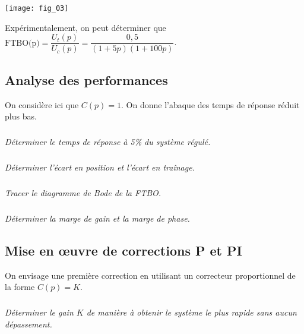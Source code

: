 \begin{multicols}{2}
\begin{center}
\texttt{[image: fig\_03]}
\end{center}
%
%
%
%
%

Expérimentalement, on peut déterminer que $\text{FTBO(p)}=\dfrac{U_t(p)}{U_c(p)}=\dfrac{0,5}{\left(1+5 p \right)\left(1+100 p \right)}$.

\subsection*{Analyse des performances}
On considère ici que $C(p)=1$. On donne l'abaque des temps de réponse réduit plus bas.

\subparagraph{}\textit{Déterminer le temps de réponse à 5\% du système régulé.}
\subparagraph{}\textit{Déterminer l'écart en position et l'écart en traînage.}

\subparagraph{}\textit{Tracer le diagramme de Bode de la FTBO.}

\subparagraph{}\textit{Déterminer la marge de gain et la marge de phase.}

\subsection*{Mise en \oe{}uvre de corrections P et PI}

On envisage une première correction en utilisant un correcteur proportionnel de la forme $C(p)=K$.


\subparagraph{}\textit{Déterminer le gain $K$ de manière à obtenir le système le plus rapide sans aucun dépassement.}



\end{multicols}
